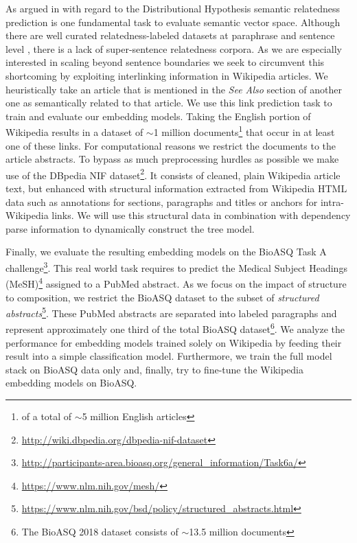 As argued in \textcite{binder_comparison_2018} with regard to the Distributional Hypothesis \autocite{harris_distributional_1954} semantic relatedness \autocite{resnik_semantic_1999, budanitsky_evaluating_2006} prediction is one fundamental task to evaluate semantic vector space. Although there are well curated relatedness-labeled datasets at paraphrase and sentence level \autocite{pavlick_ppdb_2015, dolan_automatically_2005, marelli_sick_2014,cer_semeval-2017_2017}, there is a lack of super-sentence relatedness corpora. As we are especially interested in scaling beyond sentence boundaries %
we seek to circumvent this shortcoming by exploiting interlinking information in Wikipedia articles. We heuristically take an article that is mentioned in the \textit{See Also}  section of another one as semantically related to that article. We use this link prediction task to train and evaluate our embedding models. Taking the English portion of Wikipedia results in a dataset of $\sim$1 million documents\footnote{of a total of $\sim$5 million English articles} that occur in at least one of these links. For computational reasons we restrict the documents to the article abstracts. To bypass as much preprocessing hurdles as possible we make use of the DBpedia NIF \autocite{dojchinovski_dbpedia_2018} dataset\footnote{\url{http://wiki.dbpedia.org/dbpedia-nif-dataset}}. It consists of cleaned, plain Wikipedia article text, but enhanced with structural information extracted from Wikipedia HTML data such as annotations for sections, paragraphs and titles or anchors for intra-Wikipedia links. We will use this structural data in combination with dependency parse information to dynamically construct the tree model.

Finally, we evaluate the resulting embedding models on the BioASQ Task A challenge\footnote{\url{http://participants-area.bioasq.org/general_information/Task6a/}}. This real world task requires to predict the Medical Subject Headings (MeSH)\footnote{\url{https://www.nlm.nih.gov/mesh/}} assigned to a PubMed abstract. As we focus on the impact of structure to composition, we restrict the BioASQ dataset to the subset of \textit{structured abstracts}\footnote{\url{https://www.nlm.nih.gov/bsd/policy/structured_abstracts.html}}. These PubMed abstracts are separated into labeled paragraphs and represent approximately one third of the total BioASQ dataset\footnote{The BioASQ 2018 dataset consists of $\sim$13.5 million documents}. We analyze the performance for embedding models trained solely on Wikipedia by feeding their result into a simple classification model. Furthermore, we train the full model stack on BioASQ data only and, finally, try to fine-tune the Wikipedia embedding models on BioASQ.  



